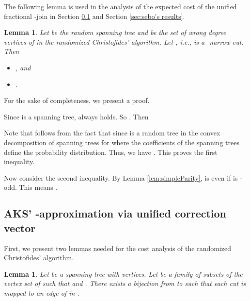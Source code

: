 \documentclass[11pt]{article}
\newcommand{\qed}{\hspace*{\fill}}
\newtheorem{lemma}[theorem]{Lemma}
\newenvironment{proof}[1][Proof. ]{\noindent {\bf #1 }}{\qed}
\begin{document}
The following lemma is used in the analysis of the expected cost of the unified fractional -join in
Section \ref{sec:AKS'results} and Section \ref{sec:sebo's results}.

\begin{lemma}\cite{AKS12}\cite{sebo13}\label{lem:probBound}
Let  be the random spanning tree and
 be the set of wrong degree vertices of  in the
randomized Christofides' algorithm.
Let , i.e.,  is a -narrow cut.
Then
\begin{itemize}
\item[(i)]
, and
\item[(ii)]
.
\end{itemize}
\end{lemma}

\vspace{2mm}

For the sake of completeness, we present a proof.
\vspace{3mm}

\begin{proof}
Since  is a spanning tree,  always holds.
So . Then

Note that  follows from the fact that  since  is a random tree in the convex decomposition
of spanning trees for  where the coefficients of the spanning trees define the probability distribution. Thus, we have
.
This proves the first inequality.

Now consider the second inequality.
By Lemma \ref{lem:simpleParity},  is even if  is -odd.
This means .
\end{proof}



\subsection{AKS' -approximation via
unified correction vector} \label{sec:AKS'results}

First, we present two lemmas needed for the cost analysis of the randomized Christofides' algorithm.
\begin{lemma}\label{base_inj}
Let  be a spanning tree with  vertices. Let  be a family of subsets
of the vertex set of  such that
 and . There exists a bijection from  to  such that
each cut  is mapped to an edge of  in .
\end{lemma}
\end{document}
